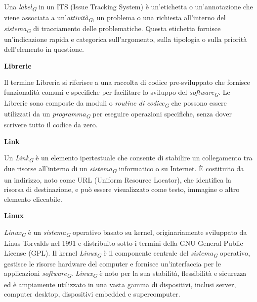 \documentclass{article}
\begin{document}
\vspace{0.1cm}

Una \textit{label}\textsubscript{\textit{G}} in un ITS (Issue Tracking System) è un'etichetta o un'annotazione che viene associata a un'\textit{attività}\textsubscript{\textit{G}}, un problema o una richiesta all'interno del \textit{sistema}\textsubscript{\textit{G}} di tracciamento delle problematiche. Questa etichetta fornisce un'indicazione rapida e categorica sull'argomento, sulla tipologia o sulla priorità dell'elemento in questione.

\vspace{0.4cm}

\textbf{Librerie}

\vspace{0.1cm}

Il termine Libreria si riferisce a una raccolta di codice pre-sviluppato che fornisce funzionalità comuni e specifiche per facilitare lo sviluppo del \textit{software}\textsubscript{\textit{G}}. Le Librerie sono composte da moduli o \textit{routine di codice}\textsubscript{\textit{G}} che possono essere utilizzati da un \textit{programma}\textsubscript{\textit{G}} per eseguire operazioni specifiche, senza dover scrivere tutto il codice da zero.

\vspace{0.4cm}

\textbf{Link}

\vspace{0.1cm}

Un \textit{Link}\textsubscript{\textit{G}} è un elemento ipertestuale che consente di stabilire un collegamento tra due risorse all'interno di un \textit{sistema}\textsubscript{\textit{G}} informatico o su Internet. È costituito da un indirizzo, noto come URL (Uniform Resource Locator), che identifica la risorsa di destinazione, e può essere visualizzato come testo, immagine o altro elemento cliccabile. 


\vspace{0.4cm}

\textbf{Linux}

\vspace{0.1cm}

\textit{Linux}\textsubscript{\textit{G}} è un \textit{sistema}\textsubscript{\textit{G}} operativo basato su kernel, originariamente sviluppato da Linus Torvalds nel 1991 e distribuito sotto i termini della GNU General Public License (GPL). Il kernel \textit{Linux}\textsubscript{\textit{G}} è il componente centrale del \textit{sistema}\textsubscript{\textit{G}} operativo, gestisce le risorse hardware del computer e fornisce un'interfaccia per le applicazioni \textit{software}\textsubscript{\textit{G}}. \textit{Linux}\textsubscript{\textit{G}} è noto per la sua stabilità, flessibilità e sicurezza ed è ampiamente utilizzato in una vasta gamma di dispositivi, inclusi server, computer desktop, dispositivi embedded e supercomputer. 
\end{document}
